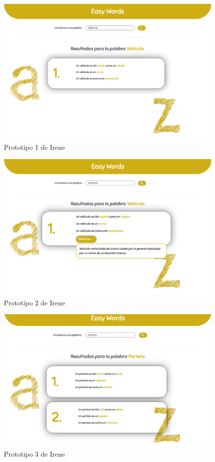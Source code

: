 \begin{figure}[!t]
	\includegraphics[width=.8\textwidth]{Imagenes/Bitmap/Mockups/mockup1_irene_inicial.png}
	\centering
	\caption{Prototipo 1 de Irene}
	\label{fig:mockup1irene_vInicial}
\end{figure}

\begin{figure}[!t]
	\includegraphics[width=.8\textwidth]{Imagenes/Bitmap/Mockups/mockup2_irene_inicial.png}
	\centering
	\caption{Prototipo 2 de Irene}
	\label{fig:mockup2irene_vInicial}
\end{figure}

\begin{figure}[!t]
	\includegraphics[width=.8\textwidth]{Imagenes/Bitmap/Mockups/mockup3_irene_inicial.png}
	\centering
	\caption{Prototipo 3 de Irene}
	\label{fig:mockup3irene_vInicial}
\end{figure}

